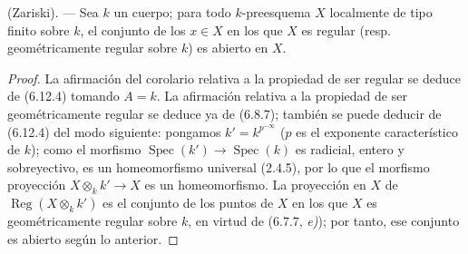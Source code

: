 \begin{corollary}[6.12.5]
\label{IV.2.s6.12.5-fr}
\textnormal{(Zariski).} --- Sea $k$ un cuerpo; para todo $k$-preesquema $X$
localmente de tipo finito sobre $k$, el conjunto de los $x\in X$ en los que
$X$ es regular \textup{(resp.} geométricamente regular sobre $k$\textup{)} es
abierto en $X$.
\end{corollary}

\begin{proof}
La afirmación del corolario relativa a la propiedad de ser regular se deduce
de (6.12.4) tomando $A=k$. La afirmación relativa a la propiedad de ser
geométricamente regular se deduce ya de (6.8.7); también se puede deducir de
(6.12.4) del modo siguiente: pongamos $k'=k^{p^{-\infty}}$ ($p$ es el
exponente característico de $k$); como el morfismo
$\operatorname{Spec}(k')\to\operatorname{Spec}(k)$ es radicial, entero y
sobreyectivo, es un homeomorfismo universal (2.4.5), por lo que el morfismo
proyección $X\otimes_kk'\to X$ es un homeomorfismo. La proyección en $X$ de
$\operatorname{Reg}(X\otimes_kk')$ es el conjunto de los puntos de $X$ en los
que $X$ es geométricamente regular sobre $k$, en virtud de (6.7.7, \emph{e)});
por tanto, ese conjunto es abierto según lo anterior.
\end{proof}
